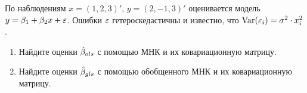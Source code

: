 \begin{problem}
По наблюдениям $x=(1,2,3)'$, $y=(2,-1,3)'$ оценивается модель $y=\beta_1+\beta_2 x+\varepsilon$. Ошибки $\varepsilon$ гетероскедастичны и известно, что $\operatorname{Var}(\varepsilon_i)=\sigma^2 \cdot x_i^2$.
\begin{enumerate}
\item Найдите оценки $\hat{\beta}_{ols}$ с помощью МНК и их ковариационную матрицу.
\item Найдите оценки $\hat{\beta}_{gls}$ с помощью обобщенного МНК и их ковариационную матрицу.
\end{enumerate}


\begin{sol}
\end{sol}
\end{problem}





